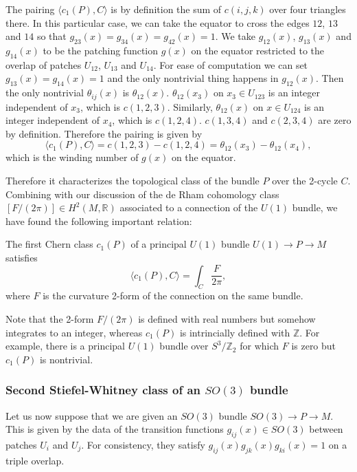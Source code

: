 \documentclass[12pt]{article}
\numberwithin{equation}{section}
\theoremstyle{remark}
\def\bR{\mathbb{R}}
\def\bZ{\mathbb{Z}}
\begin{document}
The pairing $\langle c_1(P),C\rangle$ is by definition 
the sum of $c(i,j,k)$ over four triangles there.
In this particular case, we can take the equator to cross the edges $12$, $13$ and $14$ so that $g_{23}(x)=g_{34}(x)=g_{42}(x)=1$. 
We take $g_{12}(x)$, $g_{13}(x)$ and $g_{14}(x)$ to be the patching function $g(x)$ on the equator restricted to the overlap of patches $U_{12}$, $U_{13}$ and $U_{14}$.
For ease of computation we can set $g_{13}(x)=g_{14}(x)=1$ 
and the only nontrivial thing happens in $g_{12}(x)$.
Then the only nontrivial $\theta_{ij}(x)$ is $\theta_{12}(x)$.
$\theta_{12}(x_3)$ on $x_3\in U_{123}$ is an integer independent of $x_3$, which is $c(1,2,3)$. 
Similarly, $\theta_{12}(x)$ on $x\in U_{124}$ is an integer independent of $x_4$, which is $c(1,2,4)$.
$c(1,3,4)$ and $c(2,3,4)$ are zero by definition.
Therefore the pairing is given by \begin{equation}
\langle c_1(P),C\rangle = c(1,2,3) - c(1,2,4) = \theta_{12}(x_3)-\theta_{12}(x_4),
\end{equation} which is the winding number of $g(x)$ on the equator. 

Therefore it characterizes the topological class of the bundle $P$ over the 2-cycle $C$.
Combining with our discussion of the de Rham cohomology class $[F/(2\pi)]\in H^2(M,\bR)$ associated to a connection of the $U(1)$ bundle, 
we have found the following important relation:
\begin{proposition}
  The first Chern class $c_1(P)$ of a principal $U(1)$ bundle $U(1)\to P\to M$ 
  satisfies 
  \begin{equation}
    \langle c_1(P),C\rangle = \int_C \frac{F}{2\pi},
  \end{equation}
  where $F$ is the curvature 2-form of the connection on the same bundle.
\end{proposition}

Note that the 2-form $F/(2\pi)$ is defined with real numbers but somehow integrates to an integer,
whereas $c_1(P)$ is intrincially defined with $\bZ$.
For example, there is a principal $U(1)$ bundle over $S^3/\bZ_2$
for which $F$ is zero but $c_1(P)$ is nontrivial.

\subsubsection{Second Stiefel-Whitney class of an $SO(3)$ bundle}

Let us now suppose that we are given an $SO(3)$ bundle $SO(3)\to P\to M$.
This is given by the data of the transition functions $g_{ij}(x)\in SO(3)$
between patches $U_i$ and $U_j$.
For consistency, they satisfy $g_{ij}(x)g_{jk}(x)g_{ki}(x)=1$ on a triple overlap.
\end{document}
